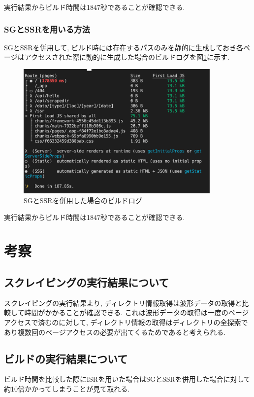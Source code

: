 実行結果からビルド時間は1847秒であることが確認できる.

\subsubsection{SGとSSRを用いる方法}
SGとSSRを併用して, ビルド時には存在するパスのみを静的に生成しておき各ページはアクセスされた際に動的に生成した場合のビルドログを図\ref{fig:SG-SSR-build}に示す.

\begin{figure}[htbp]
	\begin{center}
		\includegraphics[width=100mm]{SGandSSR.png}
		\caption{SGとSSRを併用した場合のビルドログ}\label{fig:SG-SSR-build}
	\end{center}
\end{figure}

実行結果からビルド時間は1847秒であることが確認できる.

\section{考察}
\subsection{スクレイピングの実行結果について}
スクレイピングの実行結果より, ディレクトリ情報取得は波形データの取得と比較して時間がかかることが確認できる.
これは波形データの取得は一度のページアクセスで済むのに対して, ディレクトリ情報の取得はディレクトリの全探索であり複数回のページアクセスの必要が出てくるためであると考えられる.

\subsection{ビルドの実行結果について}
ビルド時間を比較した際にISRを用いた場合はSGとSSRを併用した場合に対して約10倍かかってしまうことが見て取れる.

